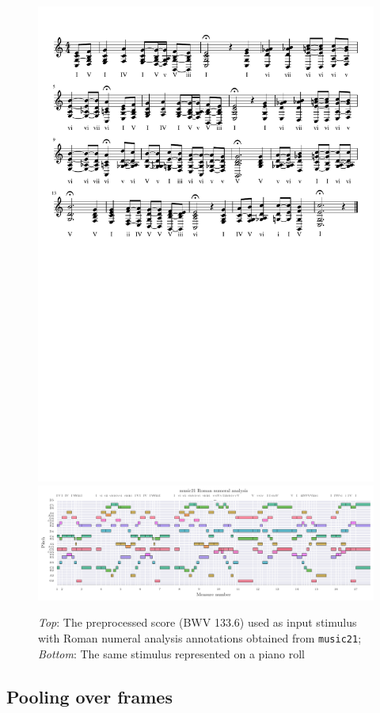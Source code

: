 \begin{figure}[p]
    \centering
    \includegraphics[trim={0 15cm 0 0},clip,width=0.9\linewidth]{model-analysis-input-score.pdf}
    \includegraphics[width=1.00\linewidth]{model-analysis-input-piano-roll.pdf}
    \caption{{\it Top}: The preprocessed score (BWV 133.6) used as input stimulus with Roman numeral analysis annotations obtained
        from {\tt music21}; {\it Bottom}: The same stimulus represented on a piano roll}
    \label{fig:model-analysis-stimulus}
\end{figure}

\subsection{Pooling over frames}

